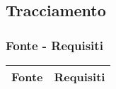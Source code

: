 \subsection{Tracciamento}
\subsubsection{Fonte - Requisiti}
\begin{center}
	\begin{longtable}{|p{44mm}|p{22mm}|}
		\hline
		\rowcolor{lighter-grayer}
		\textbf{Fonte} &  \textbf{Requisiti}  \\
		\hline
		\endhead
		
		





\end{longtable}
\end{center}
